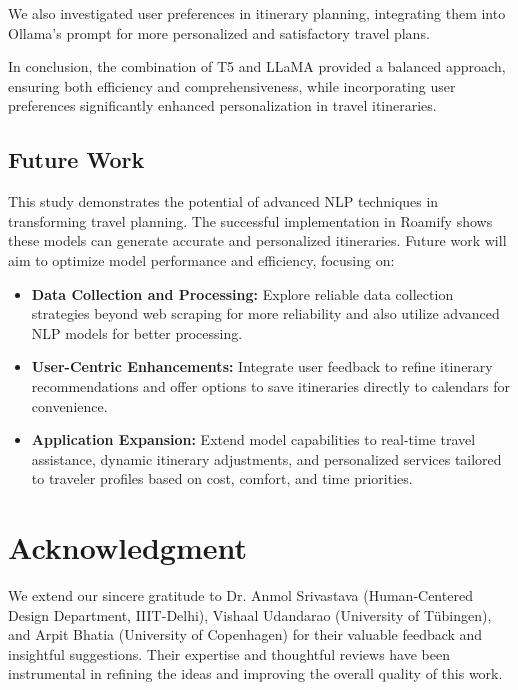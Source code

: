 \documentclass[final,1p,times]{elsarticle}
\begin{document}
    We also investigated user preferences in itinerary planning, integrating them into Ollama's prompt for more personalized and satisfactory travel plans.
    
    In conclusion, the combination of T5 and LLaMA provided a balanced approach, ensuring both efficiency and comprehensiveness, while incorporating user preferences significantly enhanced personalization in travel itineraries.
    
    \subsection{Future Work}
        
        This study demonstrates the potential of advanced NLP techniques in transforming travel planning. The successful implementation in Roamify shows these models can generate accurate and personalized itineraries. Future work will aim to optimize model performance and efficiency, focusing on:
        \begin{itemize}
            \item \textbf{Data Collection and Processing:} Explore reliable data collection strategies beyond web scraping for more reliability and also utilize advanced NLP models for better processing.
            \item \textbf{User-Centric Enhancements:} Integrate user feedback to refine itinerary recommendations and offer options to save itineraries directly to calendars for convenience.
            \item \textbf{Application Expansion:} Extend model capabilities to real-time travel assistance, dynamic itinerary adjustments, and personalized services tailored to traveler profiles based on cost, comfort, and time priorities.
        \end{itemize}

\section*{Acknowledgment}

    We extend our sincere gratitude to Dr. Anmol Srivastava (Human-Centered Design Department, IIIT-Delhi), Vishaal Udandarao (University of Tübingen), and Arpit Bhatia (University of Copenhagen) for their valuable feedback and insightful suggestions. Their expertise and thoughtful reviews have been instrumental in refining the ideas and improving the overall quality of this work.

\newpage
\end{document}
